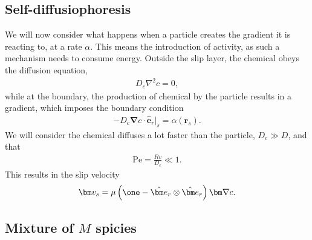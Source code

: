 \subsection*{Self-diffusiophoresis}

We will now consider what happens when a particle creates the gradient it is reacting to, at a rate $\alpha$.
This means the introduction of activity, as such a mechanism needs to consume energy.
Outside the slip layer, the chemical obeys the diffusion equation,
%
\begin{align}
    D_c \nabla^2 c = 0,
\end{align}
%
while at the boundary, the production of chemical by the particle results in a gradient, which imposes the boundary condition
%
\begin{align}
    - D_c \bm \nabla c \cdot \hat{\bm e}_r \big|_s = \alpha(\bm r_s).
\end{align}
%
We will consider the chemical diffuses a lot faster than the particle, $D_c \gg D$, and that 
%
\begin{align}
    \mathrm{Pe} = \frac{R v}{D_c }\ll 1.
\end{align}
%
This results in the slip velocity
%
\begin{align}
    \bm v_s = \mu\left( \one - \hat {\bm e}_r \otimes \hat {\bm e}_r \right) \bm \nabla c.
\end{align}
%

\subsection*{Mixture of $M$ spicies}


